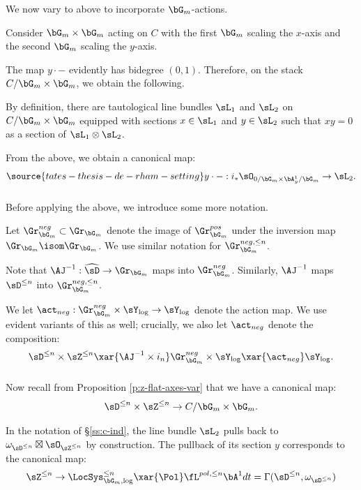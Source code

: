 We now vary to above to incorporate $\bG_m$-actions.

Consider $\bG_m \times \bG_m$ acting on
$C$ with the first $\bG_m$ scaling the $x$-axis
and the second $\bG_m$ scaling the $y$-axis.

The map $y\cdot-$ evidently has bidegree
$(0,1)$.
Therefore, on the stack $C/\bG_m\times\bG_m$, we obtain
the following.

By definition, there are tautological line bundles
$\sL_1$ and $\sL_2$ on $C/\bG_m\times \bG_m$
equipped with sections $x \in \sL_1$ and
$y \in \sL_2$ such that
$xy = 0$ as a section of $\sL_1 \otimes \sL_2$.

From the above, we obtain a canonical map:
%
\begin{equation}\label{eq:sections-ann}
\source{tates-thesis-de-rham-setting}
y\cdot -: i_*\sO_{0/\bG_m \times \bA_y^1/\bG_m} \to \sL_2.
\end{equation}

\subsubsection{}

Before applying the above, we introduce some more
notation.

Let $\Gr_{\bG_m}^{neg} \subset \Gr_{\bG_m}$ denote
the image of $\Gr_{\bG_m}^{pos}$ under the inversion
map $\Gr_{\bG_m} \isom \Gr_{\bG_m}$.
We use similar notation for $\Gr_{\bG_m}^{neg,\leq n}$.

Note that $\AJ^{-1}:\widehat{\sD} \to \Gr_{\bG_m}$
maps into $\Gr_{\bG_m}^{neg}$. Similarly,
$\AJ^{-1}$ maps $\sD^{\leq n}$ into
$\Gr_{\bG_m}^{neg,\leq n}$.

We let $\act_{neg}:\Gr_{\bG_m}^{neg} \times \sY_{\log}
\to \sY_{\log}$ denote the action map.
We use evident variants of this as well; crucially,
we also let $\act_{neg}$ denote the composition:
%
\[
\sD^{\leq n} \times \sZ^{\leq n}
\xar{\AJ^{-1} \times i_n}
\Gr_{\bG_m}^{neg} \times \sY_{\log} \xar{\act_{neg}}
\sY_{\log}.
\]

\subsubsection{}\label{ss:act-inv}

Now recall from Proposition \ref{p:z-flat-axes-var}
that we have a canonical map:
%
\[
\sD^{\leq n} \times \sZ^{\leq n} \to
C/\bG_m \times \bG_m.
\]

In the notation of \S \ref{ss:c-ind},
the line bundle $\sL_2$ pulls
back to
$\omega_{\sD^{\leq n}} \boxtimes \sO_{\sZ^{\leq n}}$
by construction. The pullback of its section $y$
corresponds to the canonical map:
%
\[
\sZ^{\leq n} \to \LocSys_{\bG_m,\log}^{\leq n}
\xar{\Pol}
\fL^{pol,\leq n} \bA^1 dt =
\Gamma(\sD^{\leq n},\omega_{\sD^{\leq n}})
\]

